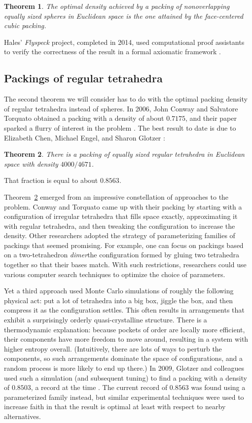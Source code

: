 \documentclass{amsart}
\newtheorem{theorem}{Theorem}[section]
\theoremstyle{definition}
\theoremstyle{remark}
\numberwithin{equation}{section}
\begin{document}
\begin{theorem}
\label{theorem:hales}
The optimal density achieved by a packing of nonoverlapping equally sized spheres in Euclidean space is the one attained by the face-centered cubic packing.
\end{theorem}
\noindent Hales' \emph{Flyspeck} project, completed in 2014, used computational proof assistants to verify the correctness of the result in a formal axiomatic framework \cite{hales:et:al:17}.

\subsection{Packings of regular tetrahedra}

The second theorem we will consider has to do with the optimal packing density of regular tetrahedra instead of spheres. In 2006, John Conway and Salvatore Torquato obtained a packing with a density of about $0.7175$, and their paper sparked a flurry of interest in the problem \cite{conway:torquato:06}. The best result to date is due to Elizabeth Chen, Michael Engel, and Sharon Glotzer \cite{chen:engel:glotzer:10}:
\begin{theorem}
\label{theorem:tetrahedra}
There is a packing of equally sized regular tetrahedra in Euclidean space with density $4000/4671$.
\end{theorem}
\noindent That fraction is equal to about $0.8563$.

Theorem~\ref{theorem:tetrahedra} emerged from an impressive constellation of approaches to the problem. Conway and Torquato came up with their packing by starting with a configuration of irregular tetrahedra that fills space exactly, approximating it with regular tetrahedra, and then tweaking the configuration to increase the density. Other researchers adopted the strategy of parameterizing families of packings that seemed promising. For example, one can focus on packings based on a two-tetrahedron \emph{dimer}the configuration formed by gluing two tetrahedra together so that their bases match. With such restrictions, researchers could use various computer search techniques to optimize the choice of parameters.

Yet a third approach used Monte Carlo simulations of roughly the following physical act: put a lot of tetrahedra into a big box, jiggle the box, and then compress it as the configuration settles. This often results in arrangements that exhibit a surprisingly orderly quasi-crystalline structure. There is a thermodynamic explanation: because pockets of order are locally more efficient, their components have more freedom to move around, resulting in a system with higher entropy overall. (Intuitively, there are lots of ways to perturb the components, so such arrangements dominate the space of configurations, and a random process is more likely to end up there.) In 2009, Glotzer and colleagues used such a simulation (and subsequent tuning) to find a packing with a density of $0.8503$, a record at the time \cite{haji:akbari:et:al:09}. The current record of $0.8563$ was found using a parameterized family instead, but similar experimental techniques were used to increase faith in that the result is optimal at least with respect to nearby alternatives.
\end{document}
